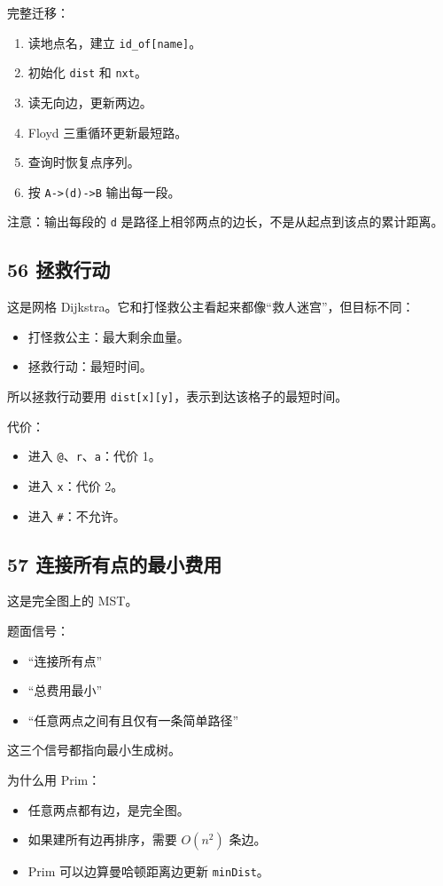 \documentclass[10pt,a4paper,fontset=none]{ctexart}
\begin{document}
完整迁移：
\begin{enumerate}
  \item 读地点名，建立 \texttt{id\_of[name]}。
  \item 初始化 \texttt{dist} 和 \texttt{nxt}。
  \item 读无向边，更新两边。
  \item Floyd 三重循环更新最短路。
  \item 查询时恢复点序列。
  \item 按 \texttt{A->(d)->B} 输出每一段。
\end{enumerate}

注意：输出每段的 \texttt{d} 是路径上相邻两点的边长，不是从起点到该点的累计距离。

\subsection{56 拯救行动}
这是网格 Dijkstra。它和打怪救公主看起来都像“救人迷宫”，但目标不同：
\begin{itemize}
  \item 打怪救公主：最大剩余血量。
  \item 拯救行动：最短时间。
\end{itemize}

所以拯救行动要用 \texttt{dist[x][y]}，表示到达该格子的最短时间。

代价：
\begin{itemize}
  \item 进入 \texttt{@}、\texttt{r}、\texttt{a}：代价 1。
  \item 进入 \texttt{x}：代价 2。
  \item 进入 \texttt{\#}：不允许。
\end{itemize}

\subsection{57 连接所有点的最小费用}
这是完全图上的 MST。

题面信号：
\begin{itemize}
  \item “连接所有点”
  \item “总费用最小”
  \item “任意两点之间有且仅有一条简单路径”
\end{itemize}
这三个信号都指向最小生成树。

为什么用 Prim：
\begin{itemize}
  \item 任意两点都有边，是完全图。
  \item 如果建所有边再排序，需要 $O(n^2)$ 条边。
  \item Prim 可以边算曼哈顿距离边更新 \texttt{minDist}。
\end{itemize}
\end{document}
